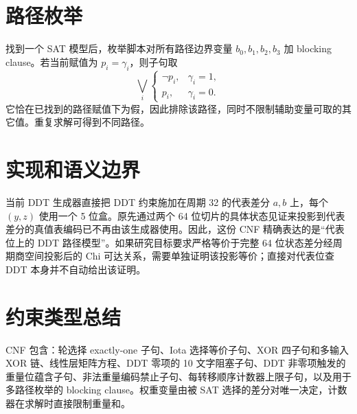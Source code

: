 \documentclass[UTF8,a4paper]{ctexart}
\begin{document}
\section{路径枚举}
找到一个 SAT 模型后，枚举脚本对所有路径边界变量 \(b_0,b_1,b_2,b_3\) 加 blocking clause。若当前赋值为 \(p_i=\gamma_i\)，则子句取
\[
\bigvee_i\begin{cases}\neg p_i,&\gamma_i=1,\\p_i,&\gamma_i=0.\end{cases}
\]
它恰在已找到的路径赋值下为假，因此排除该路径，同时不限制辅助变量可取的其它值。重复求解可得到不同路径。

\section{实现和语义边界}
当前 DDT 生成器直接把 DDT 约束施加在周期 32 的代表差分 \(a,b\) 上，每个 \((y,z)\) 使用一个 5 位盒。原先通过两个 64 位切片的具体状态见证来投影到代表差分的真值表编码已不再由该生成器使用。因此，这份 CNF 精确表达的是“代表位上的 DDT 路径模型”。如果研究目标要求严格等价于完整 64 位状态差分经周期商空间投影后的 Chi 可达关系，需要单独证明该投影等价；直接对代表位查 DDT 本身并不自动给出该证明。

\section{约束类型总结}
CNF 包含：轮选择 exactly-one 子句、Iota 选择等价子句、XOR 四子句和多输入 XOR 链、线性层矩阵方程、DDT 零项的 10 文字阻塞子句、DDT 非零项触发的重量位蕴含子句、非法重量编码禁止子句、每转移顺序计数器上限子句，以及用于多路径枚举的 blocking clause。权重变量由被 SAT 选择的差分对唯一决定，计数器在求解时直接限制重量和。
\end{document}
